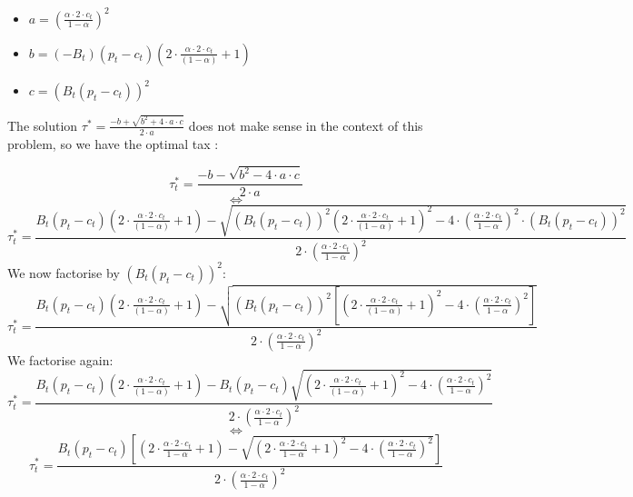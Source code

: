 \documentclass{article}
\begin{document}
\begin{itemize}
    \item $a = \left(\frac{\alpha \cdot 2\cdot c_{t}}{1-\alpha}\right)^{2}$
    \item $b = \left(-B_{t}\right)\left(p_{t}-c_{t}\right)\left(2\cdot \frac{\alpha \cdot 2\cdot c_{t}}{(1-\alpha)}+1\right)$
    \item $c = \left(B_{t}(p_{t}-c_{t})\right)^{2}$
\end{itemize}
The solution $\tau^{*}=\frac{-b+\sqrt{b^2+4\cdot a\cdot c}}{2\cdot a}$ does not make sense in the context of this problem, so we have the optimal tax : 

\begin{equation*}
    \tau_{t}^{*}=\frac{-b-\sqrt{b^2-4\cdot a\cdot c}}{2\cdot a}
\end{equation*}
$$\iff$$
\begin{equation*}
    \tau_{t}^{*}=\frac{B_{t}\left(p_{t}-c_{t}\right)\left(2\cdot \frac{\alpha \cdot 2\cdot c_{t}}{(1-\alpha)}+1\right)-\sqrt{\left(B_{t}\left(p_{t}-c_{t}\right)\right)^{2}\left(2\cdot \frac{\alpha \cdot 2\cdot c_{t}}{(1-\alpha)}+1\right)^2-4\cdot \left(\frac{\alpha \cdot 2\cdot c_{t}}{1-\alpha}\right)^{2}\cdot \left(B_{t}(p_{t}-c_{t})\right)^{2}}}{2\cdot \left(\frac{\alpha \cdot 2\cdot c_{t}}{1-\alpha}\right)^{2}}
\end{equation*}
We now factorise by $(B_{t}\left(p_{t}-c_{t}\right))^2$:
\begin{equation*}
    \tau_{t}^{*}=\frac{B_{t}\left(p_{t}-c_{t}\right)\left(2\cdot \frac{\alpha \cdot 2\cdot c_{t}}{(1-\alpha)}+1\right)-\sqrt{\left(B_{t}\left(p_{t}-c_{t}\right)\right)^{2}\left[\left(2\cdot \frac{\alpha \cdot 2\cdot c_{t}}{(1-\alpha)}+1\right)^2-4\cdot \left(\frac{\alpha \cdot 2\cdot c_{t}}{1-\alpha}\right)^{2}\right]}}{2\cdot \left(\frac{\alpha \cdot 2\cdot c_{t}}{1-\alpha}\right)^{2}}
\end{equation*}
We factorise again:
\begin{equation*}
    \tau_{t}^{*}=\frac{B_{t}\left(p_{t}-c_{t}\right)\left(2\cdot \frac{\alpha \cdot 2\cdot c_{t}}{(1-\alpha)}+1\right)-B_{t}\left(p_{t}-c_{t}\right)\sqrt{\left(2\cdot \frac{\alpha \cdot 2\cdot c_{t}}{(1-\alpha)}+1\right)^2-4\cdot \left(\frac{\alpha \cdot 2\cdot c_{t}}{1-\alpha}\right)^{2}}}{2\cdot \left(\frac{\alpha \cdot 2\cdot c_{t}}{1-\alpha}\right)^{2}}
\end{equation*}
$$\iff$$
\begin{equation*}
    \tau_{t}^{*}=\frac{B_{t}\left(p_{t}-c_{t}\right)\left[\left(2\cdot \frac{\alpha \cdot 2\cdot c_{t}}{1-\alpha}+1\right)-\sqrt{\left(2\cdot \frac{\alpha \cdot 2\cdot c_{t}}{1-\alpha}+1\right)^2-4\cdot \left(\frac{\alpha \cdot 2\cdot c_{t}}{1-\alpha}\right)^{2}}\right]}{2\cdot \left(\frac{\alpha \cdot 2\cdot c_{t}}{1-\alpha}\right)^{2}}
\end{equation*}
\end{document}

